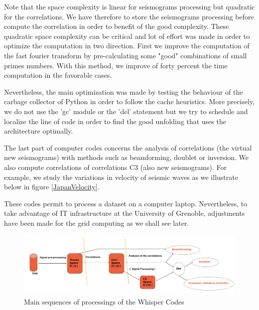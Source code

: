 \documentclass[a4paper, 10pt]{article}
\begin{document}
\begin{multicols}{2}
Note that the space complexity is linear for seismograms processing but quadratic for the correlations. We have therefore to store the seismograms processing before compute the correlation in order to benefit of the good complexity.
These quadratic space complexity can be critical and lot of effort was made in order to optimize the computation in two direction. First we improve the computation of the fast fourier transform by pre-calculating some "good" combinations of small primes numbers. 
With this method, we improve of forty percent the time computation in the favorable cases.

Nevertheless, the main optimization was made by testing the behaviour of the carbage collector of Python in order to follow the cache heuristics. More precisely, we do not use the 'gc' module or the 'del' statement but we try to schedule and localize the line of code in order to find the good unfolding that uses the architecture optimally.

The last part of computer codes concerns the analysis of correlations (the virtual new seismograms) with methods such as beamforming, doublet or inversion.
We also compute correlations of correlations C3 (also new seismograms). For example, we study the variations
in velocity of seismic waves as we illustrate below in figure \ref{JapanVelocity}. 

These codes permit to process a dataset on a computer laptop. 
Nevertheless, to take advantage of IT infrastructure at the University of Grenoble, 
adjustments have been made for the grid computing as we shall see later.

\end{multicols}
\begin{figure}[h]
\centering
\caption{\label{whisperGeneralWorflow} Main sequences of processings of the Whisper Codes}
\includegraphics[width=14cm]{briandPosterAGU2013GimpProcessing.png}
\end{figure}
\end{document}
